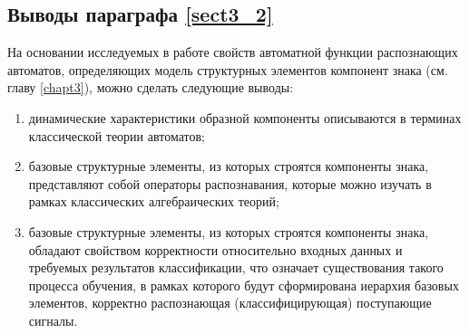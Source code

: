 \subsection{Выводы параграфа \ref{sect3_2}}
На основании исследуемых в работе свойств автоматной функции распознающих автоматов, определяющих модель структурных элементов компонент знака (см. главу \ref{chapt3}), можно сделать следующие выводы:
\begin{enumerate}
\item 
	динамические характеристики образной компоненты описываются в терминах классической теории автоматов;
\item
	базовые структурные элементы, из которых строятся компоненты знака, представляют собой операторы распознавания, которые можно изучать в рамках классических алгебраических теорий;
\item
	базовые структурные элементы, из которых строятся компоненты знака, обладают свойством корректности относительно входных данных и требуемых результатов классификации, что означает существования такого процесса обучения, в рамках которого будут сформирована иерархия базовых элементов, корректно распознающая (классифицирующая) поступающие сигналы.
\end{enumerate}

\clearpage